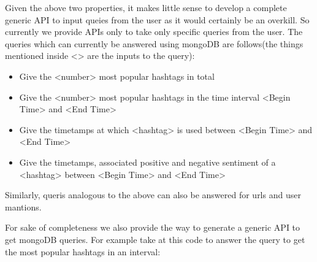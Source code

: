 \documentclass[letterpaper,10pt,english]{sphinxmanual}
\begin{document}
Given the above two properties, it makes little sense to develop a complete generic API to input queies from the user as it would certainly be an overkill. So currently we provide APIs only to take only specific queries from the user. The queries which can currently be answered using mongoDB are follows(the things mentioned inside \textless{}\textgreater{} are the inputs to the query):
\begin{itemize}
\item {} 
Give the \textless{}number\textgreater{} most popular hashtags in total

\item {} 
Give the \textless{}number\textgreater{} most popular hashtags in the time interval \textless{}Begin Time\textgreater{} and \textless{}End Time\textgreater{}

\item {} 
Give the timetamps at which \textless{}hashtag\textgreater{} is used between \textless{}Begin Time\textgreater{} and \textless{}End Time\textgreater{}

\item {} 
Give the timetamps, associated positive and negative sentiment of a \textless{}hashtag\textgreater{} between \textless{}Begin Time\textgreater{} and \textless{}End Time\textgreater{}

\end{itemize}

Similarly, queris analogous to the above can also be answered for urls and user mantions.

For sake of completeness we also provide the way to generate a generic API to get mongoDB queries. For example take at this code to answer the query to get the most popular hashtags in an interval:
\end{document}
